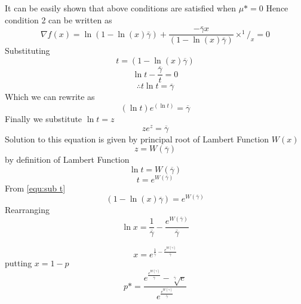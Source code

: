 \documentclass[conference]{IEEEtran}
\begin{document}
It can be easily shown that above conditions are satisfied when $\mu *=0$ 
Hence condition 2 can be written as
\[\nabla f\left( x \right)=\ln \left( 1-\ln \left( x \right)\bar{\gamma } \right)+\frac{-\bar{\gamma }x}{\left( 1-\ln \left( x \right)\bar{\gamma } \right)}{{\times }^{1}}{{/}_{x}}=0\]
Substituting 
\begin{equation} \label{equ:sub t}
t=\left( 1-\ln \left( x \right)\overline{\gamma } \right)
\end{equation}
\[\ln t-\overline{\frac{\gamma }{t}}=0\] 
\[\therefore t\ln t=\overline{\gamma } \]
Which we can rewrite as 
\[\left( \ln t \right){{e}^{\left( \ln t \right)}}=\overline{\gamma }\] 
Finally we substitute $\ln t=z$ 
\[z{{e}^{z}}=\overline{\gamma }\] 
Solution to this equation is given by principal root of Lambert Function $W\left( x \right)$ \cite{Lambert_W}
\[z=W\left( \overline{\gamma } \right)\] by definition of Lambert Function 
\[\ln t=W\left( \overline{\gamma } \right)\] 
\[t={{e}^{W\left( \overline{\gamma } \right)}}\] 
From \ref{equ:sub t}
\[\left( 1-\ln \left( x \right)\overline{\gamma } \right)={{e}^{W\left( \overline{\gamma } \right)}}\] 
Rearranging
\[\ln x=\frac{1}{\overline{\gamma }}-\frac{{{e}^{W\left( \overline{\gamma } \right)}}}{\overline{\gamma }}\] 

\[x=e^{\frac{1}{{\overline{\gamma }}}-\frac{e^{W({\overline{\gamma }})}}{{\overline{\gamma }}}}\]
putting $x=1-p$
\begin{equation} \label{equ: optimal p}
p*=\frac{{{e}^{\frac{{{e}^{W(\overline{\gamma })}}}{\overline{\gamma }}}}-\sqrt[\overline{\gamma }]{e}}{{{e}^{\frac{{{e}^{W(\overline{\gamma })}}}{\overline{\gamma }}}}}
\end{equation}

\nocite{Tse04fundamentalsof}





\end{document}
